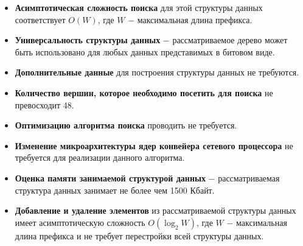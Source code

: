 \documentclass[a4paper, 12pt, titlepage, finall]{extreport}
\begin{document}
            \begin{itemize}
                \item\textbf{Асимптотическая сложность поиска} для этой структуры данных соответствует {\ttfamily $O(W)$},
                где {\ttfamily $W$} $-$ максимальная длина префикса.
                \item\textbf{Универсальность структуры данных} $-$ рассматриваемое дерево может быть использовано для любых данных представимых в битовом виде.
                \item\textbf{Дополнительные данные} для построения структуры данных не требуются.
                \item\textbf{Количество вершин, которое необходимо посетить для поиска} не превосходит 48.
                \item\textbf{Оптимизацию алгоритма поиска} проводить не требуется.
                \item\textbf{Изменение микроархитектуры ядер конвейера сетевого процессора} не требуется для реализации данного алгоритма.
                \item\textbf{Оценка памяти занимаемой структурой данных} $-$ рассматриваемая структура данных занимает не более чем 1500 Кбайт.
                \item\textbf{Добавление и удаление элементов} из рассматриваемой структуры данных имеет асимптотическую сложность 
                {\ttfamily $O(\log_2{W})$}, где {\ttfamily $W$} $-$ максимальная длина префикса и не требует перестройки всей структуры данных.
            \end{itemize}
\end{document}
